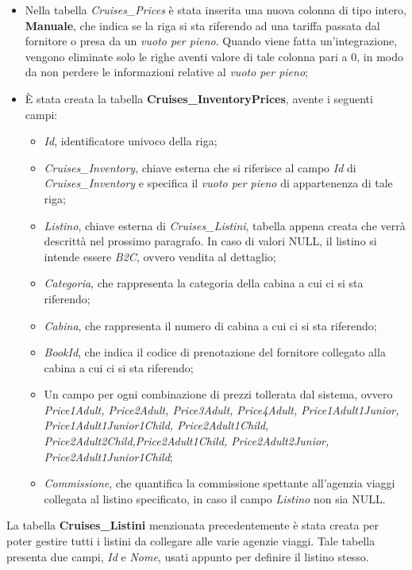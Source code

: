 \begin{itemize}
	\item Nella tabella \textit{Cruises\_Prices} è stata inserita una nuova colonna di tipo intero, \textbf{Manuale}, che indica se la riga si sta riferendo ad una tariffa passata dal fornitore o presa da un \textit{vuoto per pieno}. Quando viene fatta un'integrazione, vengono eliminate solo le righe aventi valore di tale colonna pari a 0, in modo da non perdere le informazioni relative al \textit{vuoto per pieno};
	\item È stata creata la tabella \textbf{Cruises\_InventoryPrices}, avente i seguenti campi:
		\begin{itemize}
			\item \textit{Id}, identificatore univoco della riga;
			\item \textit{Cruises\_Inventory}, chiave esterna che si riferisce al campo \textit{Id} di \textit{Cruises\_Inventory} e specifica il \textit{vuoto per pieno} di appartenenza di tale riga;
			\item \textit{Listino}, chiave esterna di \textit{Cruises\_Listini}, tabella appena creata che verrà descrittà nel prossimo paragrafo. In caso di valori NULL, il listino si intende essere \textit{B2C}, ovvero vendita al dettaglio;
			\item \textit{Categoria}, che rappresenta la categoria della cabina a cui ci si sta riferendo;
			\item \textit{Cabina}, che rappresenta il numero di cabina a cui ci si sta riferendo;
			\item \textit{BookId}, che indica il codice di prenotazione del fornitore collegato alla cabina a cui ci si sta riferendo;
			\item Un campo per ogni combinazione di prezzi tollerata dal sistema, ovvero \textit{Price1Adult, Price2Adult, Price3Adult, Price4Adult, Price1Adult1Junior, Price1Adult1Junior1Child, Price2Adult1Child, Price2Adult2Child,Price2Adult1Child, Price2Adult2Junior, Price2Adult1Junior1Child};
			\item \textit{Commissione}, che quantifica la commissione spettante all'agenzia viaggi collegata al listino specificato, in caso il campo \textit{Listino} non sia NULL.
		\end{itemize}
\end{itemize}
La tabella \textbf{Cruises\_Listini} menzionata precedentemente è stata creata per poter gestire tutti i listini da collegare alle varie agenzie viaggi. Tale tabella presenta due campi, \textit{Id} e \textit{Nome}, usati appunto per definire il listino stesso. \\
